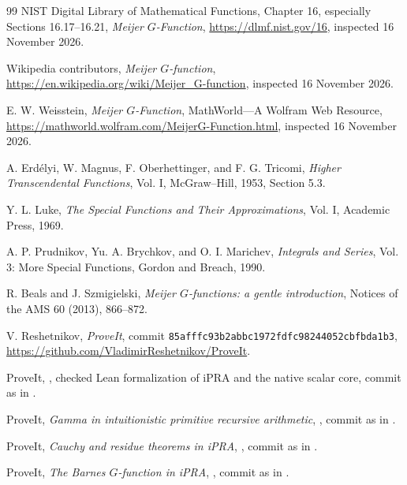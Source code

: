 \documentclass[11pt]{article}
\newcommand{\code}[1]{\texttt{#1}}
\begin{document}
\tableofcontents
\newpage

















\begin{thebibliography}{99}
NIST Digital Library of Mathematical Functions, Chapter 16, especially
Sections 16.17--16.21, \emph{Meijer $G$-Function},
\url{https://dlmf.nist.gov/16}, inspected 16 November 2026.

Wikipedia contributors, \emph{Meijer $G$-function},
\url{https://en.wikipedia.org/wiki/Meijer_G-function}, inspected 16 November 2026.

E. W. Weisstein, \emph{Meijer $G$-Function}, MathWorld---A Wolfram Web Resource,
\url{https://mathworld.wolfram.com/MeijerG-Function.html}, inspected 16 November 2026.

A. Erd\'elyi, W. Magnus, F. Oberhettinger, and F. G. Tricomi,
\emph{Higher Transcendental Functions}, Vol. I, McGraw--Hill, 1953,
Section 5.3.

Y. L. Luke, \emph{The Special Functions and Their Approximations}, Vol. I,
Academic Press, 1969.

A. P. Prudnikov, Yu. A. Brychkov, and O. I. Marichev,
\emph{Integrals and Series}, Vol. 3: More Special Functions, Gordon and Breach,
1990.

R. Beals and J. Szmigielski, \emph{Meijer $G$-functions: a gentle
introduction}, Notices of the AMS 60 (2013), 866--872.

V. Reshetnikov, \emph{ProveIt}, commit
\code{85afffc93b2abbc1972fdfc98244052cbfbda1b3},
\url{https://github.com/VladimirReshetnikov/ProveIt}.

ProveIt, , checked Lean
formalization of iPRA and the native scalar core, commit as in \cite{ProveIt}.

ProveIt, \emph{Gamma in intuitionistic primitive recursive arithmetic},
,
commit as in \cite{ProveIt}.

ProveIt, \emph{Cauchy and residue theorems in iPRA},
,
commit as in \cite{ProveIt}.

ProveIt, \emph{The Barnes $G$-function in iPRA},
,
commit as in \cite{ProveIt}.
\end{thebibliography}
\end{document}
